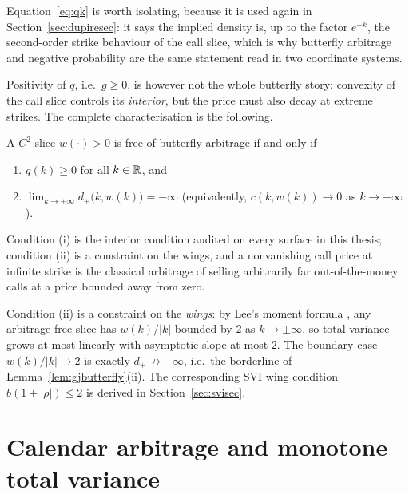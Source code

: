 Equation~\eqref{eq:qk} is worth isolating, because it is used again in
Section~\ref{sec:dupiresec}: it says the implied density is, up to the factor $e^{-k}$, the
second-order strike behaviour of the call slice, which is why butterfly arbitrage and negative
probability are the same statement read in two coordinate systems.

Positivity of $q$, i.e.\ $g\ge0$, is however not the whole butterfly story: convexity of the
call slice controls its \emph{interior}, but the price must also decay at extreme strikes. The
complete characterisation is the following.

\begin{lemma}\label{lem:gjbutterfly}
A $C^2$ slice $w(\cdot)>0$ is free of butterfly arbitrage if and only if
\begin{enumerate}[label=(\roman*)]
\item $g(k)\ge0$ for all $k\in\mathbb{R}$, and
\item $\displaystyle\lim_{k\to+\infty}d_+\bigl(k,w(k)\bigr)=-\infty$
(equivalently, $c(k,w(k))\to0$ as $k\to+\infty$).
\end{enumerate}
\end{lemma}


Condition (i) is the interior condition audited on every surface in this thesis; condition (ii)
is a constraint on the wings, and a nonvanishing call price at infinite strike is the classical
arbitrage of selling arbitrarily far out-of-the-money calls at a price bounded away from zero.

\begin{remark}\label{rem:lee}
Condition (ii) is a constraint on the \emph{wings}: by Lee's moment formula \cite{lee2004},
any arbitrage-free slice has $w(k)/|k|$ bounded by $2$ as $k\to\pm\infty$, so total variance
grows at most linearly with asymptotic slope at most $2$. The boundary case
$w(k)/|k|\to2$ is exactly $d_+\not\to-\infty$, i.e.\ the borderline of
Lemma~\ref{lem:gjbutterfly}(ii). The corresponding SVI wing condition
$b(1+|\rho|)\le2$ is derived in Section~\ref{sec:svisec}.
\end{remark}

\section{Calendar arbitrage and monotone total variance}\label{sec:calendarsec}

